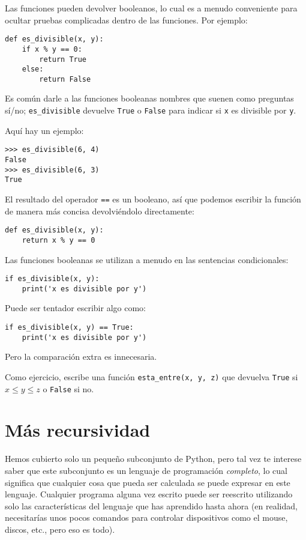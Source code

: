 \documentclass[10pt]{book}
\begin{document}
Las funciones pueden devolver booleanos, lo cual es a menudo conveniente para ocultar
pruebas complicadas dentro de las funciones.  
Por ejemplo:

\begin{verbatim}
def es_divisible(x, y):
    if x % y == 0:
        return True
    else:
        return False
\end{verbatim}
%
Es común darle a las funciones booleanas nombres que suenen como preguntas
sí/no; \verb"es_divisible" devuelve {\tt True} o {\tt False}
para indicar si {\tt x} es divisible por {\tt y}.

Aquí hay un ejemplo:

\begin{verbatim}
>>> es_divisible(6, 4)
False
>>> es_divisible(6, 3)
True
\end{verbatim}
%
El resultado del operador {\tt ==} es un booleano, así que podemos escribir la
función de manera más concisa devolviéndolo directamente:

\begin{verbatim}
def es_divisible(x, y):
    return x % y == 0
\end{verbatim}
%
Las funciones booleanas se utilizan a menudo en las sentencias condicionales:

\begin{verbatim}
if es_divisible(x, y):
    print('x es divisible por y')
\end{verbatim}
%
Puede ser tentador escribir algo como:

\begin{verbatim}
if es_divisible(x, y) == True:
    print('x es divisible por y')
\end{verbatim}
%
Pero la comparación extra es innecesaria.

Como ejercicio, escribe una función \verb"esta_entre(x, y, z)" que
devuelva {\tt True} si $x \le y \le z$ o {\tt False} si no.


\section{Más recursividad}
\label{more.recursion}

Hemos cubierto solo un pequeño subconjunto de Python, pero tal vez
te interese saber que este subconjunto es un lenguaje de programación {\em completo},
lo cual significa que cualquier cosa que pueda ser
calculada se puede expresar en este lenguaje.  Cualquier programa alguna vez escrito
puede ser reescrito utilizando solo las características del lenguaje que has aprendido
hasta ahora (en realidad, necesitarías unos pocos comandos para controlar dispositivos
como el mouse, discos, etc., pero eso es todo).
\end{document}
